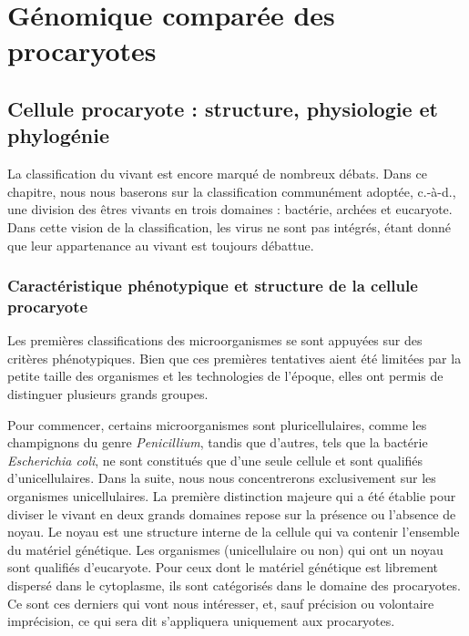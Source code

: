 \part{Génomique comparée des procaryotes}
\chapter{Cellule procaryote : structure, physiologie et phylogénie}

La classification du vivant est encore marqué de nombreux débats. Dans ce chapitre, nous nous baserons sur la classification communément adoptée, c.-à-d., une division des êtres vivants en trois domaines : bactérie, archées et eucaryote. Dans cette vision de la classification, les virus ne sont pas intégrés, étant donné que leur appartenance au vivant est toujours débattue.

\section{Caractéristique phénotypique et structure de la cellule procaryote}

Les premières classifications des microorganismes se sont appuyées sur des critères phénotypiques. Bien que ces premières tentatives aient été limitées par la petite taille des organismes et les technologies de l'époque, elles ont permis de distinguer plusieurs grands groupes.

Pour commencer, certains microorganismes sont pluricellulaires, comme les champignons du genre \textit{Penicillium}, tandis que d'autres, tels que la bactérie \textit{Escherichia coli}, ne sont constitués que d'une seule cellule et sont qualifiés d'unicellulaires. Dans la suite, nous nous concentrerons exclusivement sur les organismes unicellulaires. La première distinction majeure qui a été établie pour diviser le vivant en deux grands domaines repose sur la présence ou l'absence de noyau. Le noyau est une structure interne de la cellule qui va contenir l'ensemble du matériel génétique. Les organismes (unicellulaire ou non) qui ont un noyau sont qualifiés d'eucaryote. Pour ceux dont le matériel génétique est librement dispersé dans le cytoplasme, ils sont catégorisés dans le domaine des procaryotes. Ce sont ces derniers qui vont nous intéresser, et, sauf précision ou volontaire imprécision, ce qui sera dit s'appliquera uniquement aux procaryotes.


